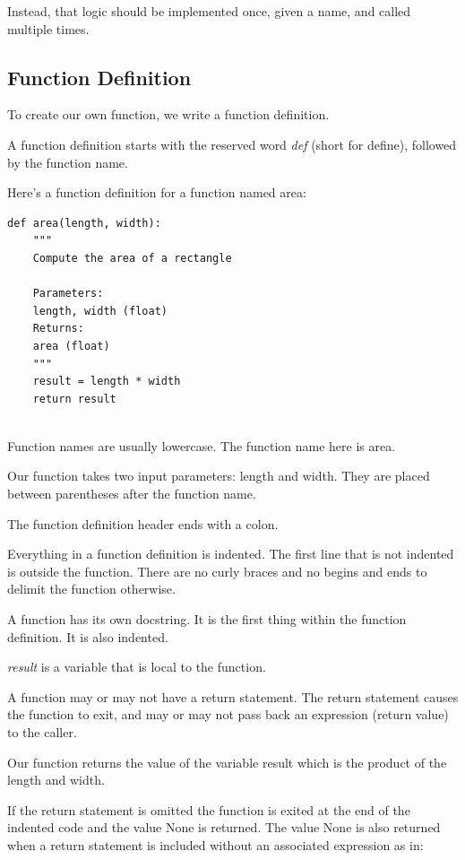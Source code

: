 \documentclass{article}
\begin{document}
Instead, that logic should be implemented once, given a name, and called multiple times.

\subsection{Function Definition}

To create our own function, we write a function definition.

A function definition starts with the reserved word \textit{def} (short for define), followed by the function name.

Here's a function definition for a function named area:

\begin{lstlisting}
def area(length, width):
    """
    Compute the area of a rectangle
 
    Parameters:
    length, width (float)
    Returns:
    area (float)
    """
    result = length * width
    return result
    
\end{lstlisting}
       
Function names are usually lowercase.  The function name here is area.

Our function takes two input parameters: length and width.  They are placed between parentheses after the function name.  

The function definition header ends with a colon.

Everything in a function  definition is indented. The first line that is not indented is outside the function.  There are no curly braces and no begins and ends to delimit the function otherwise.

A function has its own docstring.  It is the first thing within the function definition.  It is also indented.

\textit{result} is a variable that is local to the function.

A function may or may not have a return statement. The return statement causes the function to exit, and may or may not pass back an expression (return value) to the caller. 

Our function returns the value of the variable result which is the product of the length and width.

If the return statement is omitted the function is exited at the end of the indented code and the value None is returned. The value None is also returned when a return statement is included without an associated expression as in:
\end{document}
